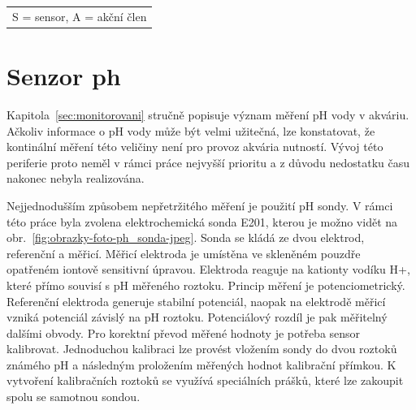 \begin{table}[h]
\begin{tabular}{|l|l|l|l|l|}
            \end{tabular}
            \begin{tabular}{c}
                S = sensor, A = akční člen \\
            \end{tabular}
   
    \end{table}










\section{Senzor \acs{ph}}
\label{sec:perif-sensor-ph}
Kapitola~\ref{sec:monitorovani} stručně popisuje význam měření pH vody v akváriu. Ačkoliv informace o pH vody může být velmi užitečná, lze konstatovat, že kontinální měření této veličiny není pro provoz akvária nutností. Vývoj této periferie proto neměl v rámci práce nejvyšší prioritu a z důvodu nedostatku času nakonec nebyla realizována.

Nejjednodušším způsobem nepřetržitého měření je použití pH sondy. V rámci této práce byla zvolena elektrochemická sonda E201, kterou je možno vidět na obr.~\ref{fig:obrazky-foto-ph_sonda-jpeg}. Sonda se kládá ze dvou elektrod, referenční a měřicí. Měřicí elektroda je umístěna ve skleněném pouzdře opatřeném iontově sensitivní úpravou. Elektroda reaguje na kationty vodíku H+, které přímo souvisí s pH měřeného roztoku. Princip měření je potenciometrický. Referenční elektroda generuje stabilní potenciál, naopak na elektrodě měřicí vzniká potenciál závislý na pH roztoku. Potenciálový rozdíl je pak měřitelný dalšími obvody. Pro korektní převod měřené hodnoty je potřeba sensor kalibrovat. Jednoduchou kalibraci lze provést vložením sondy do dvou roztoků známého pH a následným proložením měřených hodnot kalibrační přímkou. K vytvoření kalibračních roztoků se využívá speciálních prášků, které lze zakoupit spolu se samotnou sondou.

